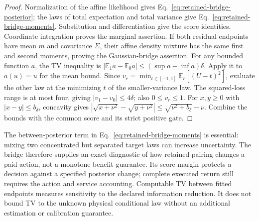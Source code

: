 \begin{proof}
Normalization of the affine likelihood gives
Eq.~\eqref{eq:retained-bridge-posterior}; the laws of total expectation
and total variance give Eq.~\eqref{eq:retained-bridge-moments}.
Substitution and differentiation give the score identities.
Coordinate integration proves the marginal assertion.  If both residual
endpoints have mean $m$ and covariance $\Sigma$, their affine density
mixture has the same first and second moments, proving the Gaussian-bridge
assertion.  For any bounded function $a$, the TV inequality is
$|\mathbb E_1a-\mathbb E_0a|\leq(\sup a-\inf a)\delta$.
Apply it to $a(u)=u$ for the mean bound.  Since
$v_r=\min_{t\in[-1,1]}\mathbb E_r[(U-t)^2]$, evaluate the other law
at the minimizing $t$ of the smaller-variance law.  The squared-loss range
is at most four, giving $|v_1-v_0|\leq4\delta$; also $0\leq v_r\leq1$.
For $x,y\geq0$ with $|x-y|\leq b_\delta$, concavity gives
$|\sqrt{x+\nu^2}-\sqrt{y+\nu^2}|\leq\sqrt{\nu^2+b_\delta}-\nu$.
Combine the bounds with the common score and its strict positive gate.
\end{proof}

The between-posterior term in Eq.~\eqref{eq:retained-bridge-moments}
is essential: mixing two concentrated but separated target laws can increase
uncertainty.  The bridge therefore supplies an exact diagnostic of how
retained pairing changes a paid action, not a monotone benefit guarantee.
Its score margin protects a decision against a specified posterior change;
complete executed return still requires the action and service accounting.
Computable TV between fitted endpoints measures sensitivity to the declared
information reduction.  It does not bound TV to the unknown physical
conditional law without an additional estimation or calibration guarantee.
